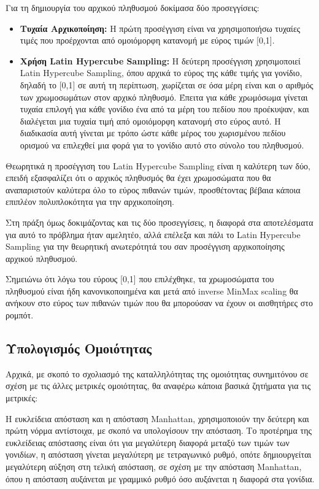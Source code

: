 \documentclass[12pt,a4paper]{article}
\begin{document}
Για τη δημιουργία του αρχικού πληθυσμού δοκίμασα δύο προσεγγίσεις: 

\begin{itemize}
    \item \textbf{Τυχαία Αρχικοποίηση:} Η πρώτη προσέγγιση είναι να χρησιμοποιήσω τυχαίες τιμές που προέρχονται από ομοιόμορφη κατανομή με εύρος τιμών [0,1]. 

    \item \textbf{Χρήση Latin Hypercube Sampling:} Η δεύτερη προσέγγιση χρησιμοποιεί Latin Hypercube Sampling, όπου αρχικά το εύρος της κάθε τιμής για γονίδιο, δηλαδή το [0,1] σε αυτή τη περίπτωση, χωρίζεται σε όσα μέρη είναι και ο αριθμός των χρωμοσωμάτων στον αρχικό πληθυσμό. Έπειτα για κάθε χρωμόσωμα γίνεται τυχαία επιλογή για κάθε γονίδιο ένα από τα μέρη του πεδίου που προέκυψαν, και διαλέγεται μια τυχαία τιμή από ομοιόμορφη κατανομή στο εύρος αυτό. Η διαδικασία αυτή γίνεται με τρόπο ώστε κάθε μέρος του χωρισμένου πεδίου ορισμού να επιλεχθεί μια φορά για το γονίδιο αυτό στο σύνολο του πληθυσμού.
\end{itemize}

Θεωρητικά η προσέγγιση του Latin Hypercube Sampling είναι η καλύτερη των δύο, επειδή εξασφαλίζει ότι ο αρχικός πληθυσμός θα έχει χρωμοσώματα που θα αναπαριστούν καλύτερα όλο το εύρος πιθανών τιμών, προσθέτοντας βέβαια κάποια επιπλέον πολυπλοκότητα για την αρχικοποίηση.

Στη πράξη όμως δοκιμάζοντας και τις δύο προσεγγίσεις, η διαφορά στα αποτελέσματα για αυτό το πρόβλημα ήταν αμελητέο, αλλά επέλεξα και πάλι το Latin Hypercube Sampling για την θεωρητική ανωτερότητά του σαν προσέγγιση αρχικοποίησης αρχικού πληθυσμού.

Σημειώνω ότι λόγω του εύρους [0,1] που επιλέχθηκε, τα χρωμοσώματα του πληθυσμού είναι ήδη κανονικοποιημένα και μετά από inverse MinMax scaling θα ανήκουν στο εύρος των πιθανών τιμών που θα μπορούσαν να έχουν οι αισθητήρες στο ρομπότ.

\subsection{Υπολογισμός Ομοιότητας}

Αρχικά, με σκοπό το σχολιασμό της καταλληλότητας της ομοιότητας συνημιτόνου σε σχέση με τις άλλες μετρικές ομοιότητας, θα αναφέρω κάποια βασικά ζητήματα για τις μετρικές:

Η ευκλείδεια απόσταση και η απόσταση Manhattan, χρησιμοποιούν την δεύτερη και πρώτη νόρμα αντίστοιχα, με σκοπό να υπολογίσουν την απόσταση. Το προτέρημα της ευκλείδειας απόστασης είναι ότι για μεγαλύτερη διαφορά μεταξύ των τιμών των γονιδίων, η απόσταση γίνεται μεγαλύτερη με τετραγωνικό ρυθμό, οπότε δημιουργείται μεγαλύτερη αύξηση στη τελική απόσταση, σε σχέση με την απόσταση Manhattan, όπου η απόσταση αυξάνεται με γραμμικό ρυθμό όσο αυξάνεται η διαφορά στα γονίδια.
\end{document}
